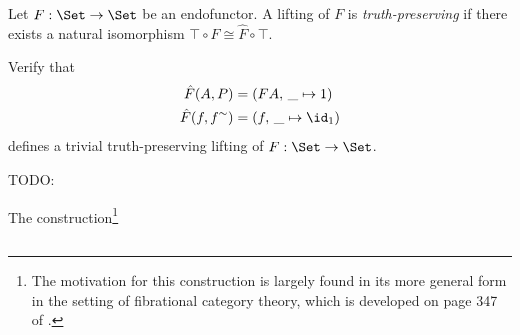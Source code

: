 \begin{definition}
  Let $F : \Set \to \Set$ be an endofunctor. A lifting of $F$ is \emph{truth-preserving} if there
  exists a natural isomorphism $\top \circ F \cong \hat F \circ \top$.
\end{definition}

\begin{exercise}
  Verify that
  \begin{align*}
    \hat F(A, P) &= (F A,\, \_ \mapsto 1)\\
    \hat F(f, f^\sim) &= (f,\, \_ \mapsto \id_1)
  \end{align*}
  defines a trivial truth-preserving lifting of $F : \Set \to \Set$.
\end{exercise}

TODO:

The construction\footnote{The motivation for this construction is largely found in its more general
form in the setting of fibrational category theory, which is developed on page 347 of
\citep{ghani2010fibrational}.}






\subsection{}




  

